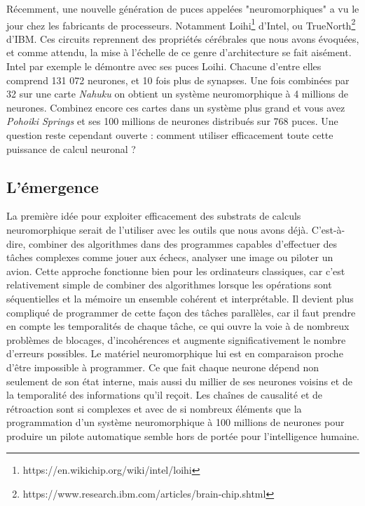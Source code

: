 	Récemment, une nouvelle génération de puces appelées "neuromorphiques" a vu le jour chez les fabricants de processeurs. Notamment Loihi\footnote{https://en.wikichip.org/wiki/intel/loihi} d'Intel, ou TrueNorth\footnote{https://www.research.ibm.com/articles/brain-chip.shtml} d'IBM. Ces circuits reprennent des propriétés cérébrales que nous avons évoquées, et comme attendu, la mise à l'échelle de ce genre d'architecture se fait aisément. Intel par exemple le démontre avec ses puces Loihi. Chacune d'entre elles comprend 131 072 neurones, et 10 fois plus de synapses. Une fois combinées par 32 sur une carte \textit{Nahuku} on obtient un système neuromorphique à 4 millions de neurones. Combinez encore ces cartes dans un système plus grand et vous avez \textit{Pohoiki Springs} et ses 100 millions de neurones distribués sur 768 puces. Une question reste cependant ouverte : comment utiliser efficacement toute cette puissance de calcul neuronal ?

\subsection{L'émergence}\label{sec:emergence}

	La première idée pour exploiter efficacement des substrats de calculs neuromorphique serait de l'utiliser avec les outils que nous avons déjà. C'est-à-dire, combiner des algorithmes dans des programmes capables d'effectuer des tâches complexes comme jouer aux échecs, analyser une image ou piloter un avion. Cette approche fonctionne bien pour les ordinateurs classiques, car c'est relativement simple de combiner des algorithmes lorsque les opérations sont séquentielles et la mémoire un ensemble cohérent et interprétable. Il devient plus compliqué de programmer de cette façon des tâches parallèles, car il faut prendre en compte les temporalités de chaque tâche, ce qui ouvre la voie à de nombreux problèmes de blocages, d'incohérences et augmente significativement le nombre d'erreurs possibles. Le matériel neuromorphique lui est en comparaison proche d'être impossible à programmer. Ce que fait chaque neurone dépend non seulement de son état interne, mais aussi du millier de ses neurones voisins et de la temporalité des informations qu'il reçoit. Les chaînes de causalité et de rétroaction sont si complexes et avec de si nombreux éléments que la programmation d'un système neuromorphique à 100 millions de neurones pour produire un pilote automatique semble hors de portée pour l'intelligence humaine. 
	
